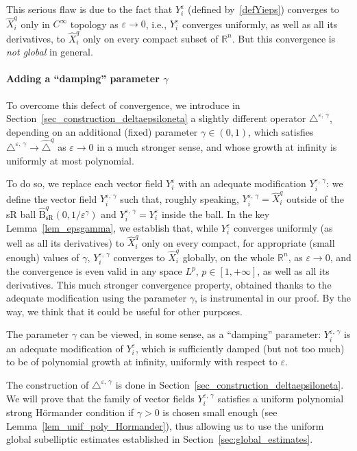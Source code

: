 \documentclass[AHL,Unicode,published]{cedram}
\newcommand*\R{\mathbb{R}}
\newcommand{\hatBsR}{\widehat{\mathrm{B}}_{\mathrm{sR}}}
\begin{document}
This serious flaw is due to the fact that $Y_i^\varepsilon$ (defined by~\eqref{defYieps}) converges to $\widehat{X}_i^{q}$ only in $C^\infty$ topology as $\varepsilon\rightarrow 0$, i.e., $Y_i^\varepsilon$ converges uniformly, as well as all its derivatives, to $\widehat{X}_i^{q}$ only on every compact subset of $\R^n$. But this convergence is \emph{not global} in general.

\paragraph{Adding a ``damping'' parameter $\gamma$}
To overcome this defect of convergence, we introduce in Section~\ref{sec_construction_deltaepsiloneta} a slightly different operator $\triangle^{\varepsilon,\,\gamma}$, depending on an additional (fixed) parameter $\gamma\in(0,1)$, which satisfies $\triangle^{\varepsilon,\,\gamma} \rightarrow \widehat{\triangle}^{q}$ as $\varepsilon\rightarrow 0$ in a much stronger sense, and whose growth at infinity is uniformly at most polynomial.

To do so, we replace each vector field $Y_i^\varepsilon$ with an adequate modification $Y_i^{\varepsilon,\,\gamma}$: we define the vector field $Y_i^{\varepsilon,\,\gamma}$ such that, roughly speaking, $Y_i^{\varepsilon,\,\gamma} = \widehat{X}^{q}_i$ outside of the sR ball $\hatBsR^{q}(0,1/\varepsilon^\gamma)$ and $Y_i^{\varepsilon,\,\gamma} = Y_i^\varepsilon$ inside the ball. In the key Lemma~\ref{lem_epsgamma}, we establish that, while $Y_i^\varepsilon$ converges uniformly (as well as all its derivatives) to $\widehat{X}_i^{q}$ only on every compact, for appropriate (small enough) values of $\gamma$, $Y_i^{\varepsilon,\,\gamma}$ converges to $\widehat{X}_i^{q}$ globally, on the whole $\R^n$, as $\varepsilon\rightarrow 0$, and the convergence is even valid in any space $L^p$, $p\in[1,+\infty]$, as well as all its derivatives. This much stronger convergence property, obtained thanks to the adequate modification using the parameter $\gamma$, is instrumental in our proof. By the way, we think that it could be useful for other purposes.

The parameter $\gamma$ can be viewed, in some sense, as a ``damping'' parameter: $Y_i^{\varepsilon,\,\gamma}$ is an adequate modification of $Y_i^\varepsilon$, which is sufficiently damped (but not too much) to be of polynomial growth at infinity, uniformly with respect to $\varepsilon$.

The construction of $\triangle^{\varepsilon,\,\gamma}$ is done in Section~\ref{sec_construction_deltaepsiloneta}. We will prove that the family of vector fields $Y_i^{\varepsilon,\,\gamma}$ satisfies a uniform polynomial strong H\"ormander condition if $\gamma>0$ is chosen small enough (see Lemma~\ref{lem_unif_poly_Hormander}), thus allowing us to use the uniform global subelliptic estimates established in Section~\ref{sec:global_estimates}.
\end{document}
